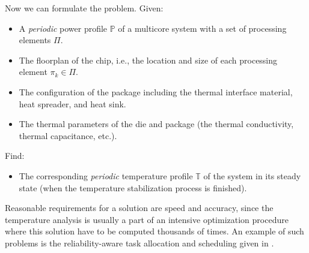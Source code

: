 Now we can formulate the problem. Given:
\begin{itemize}
  \item A \emph{periodic} power profile $\mathbb{P}$ of a multicore system with a set of processing elements $\Pi$.
  \item The floorplan of the chip, i.e., the location and size of each processing element $\pi_k \in \Pi$.
  \item The configuration of the package including the thermal interface material, heat spreader, and heat sink.
  \item The thermal parameters of the die and package (the thermal conductivity, thermal capacitance, etc.).
\end{itemize}
Find:
\begin{itemize}
  \item The corresponding \emph{periodic} temperature profile $\mathbb{T}$ of the system in its steady state (when the temperature stabilization process is finished).
\end{itemize}

Reasonable requirements for a solution are speed and accuracy, since the temperature analysis is usually a part of an intensive optimization procedure where this solution have to be computed thousands of times. An example of such problems is the reliability-aware task allocation and scheduling given in .
